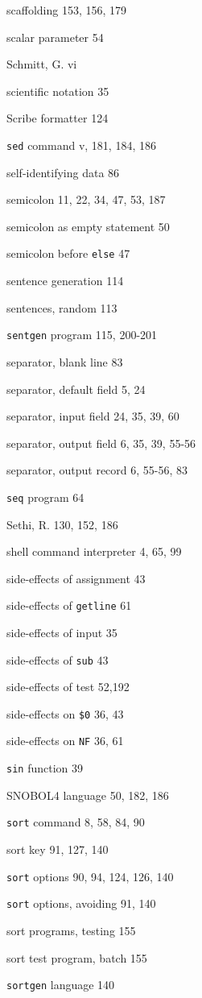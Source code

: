 \begin{multicols}{2}
scaffolding 153, 156, 179

scalar parameter 54

Schmitt, G. vi

scientific notation 35

Scribe formatter 124

\verb'sed' command v, 181, 184, 186

self-identifying data 86

semicolon 11, 22, 34, 47, 53, 187

semicolon as empty statement 50

semicolon before \verb'else' 47

sentence generation 114

sentences, random 113

\verb'sentgen' program 115, 200-201

separator, blank line 83

separator, default field 5, 24

separator, input field 24, 35, 39, 60

separator, output field 6, 35, 39, 55-56

separator, output record 6, 55-56,  83

\verb'seq' program 64

Sethi, R. 130, 152, 186

shell command interpreter 4, 65, 99

side-effects of assignment 43

side-effects of \verb'getline' 61

side-effects of input 35

side-effects of \verb'sub' 43

side-effects of test 52,192

side-effects on \verb'$0' 36, 43

side-effects on \verb'NF' 36, 61

\verb'sin' function 39

SNOBOL4 language 50, 182, 186

\verb'sort' command 8, 58, 84, 90

sort key 91, 127, 140

\verb'sort' options 90, 94, 124, 126, 140

\verb'sort' options, avoiding 91, 140


sort programs, testing 155

sort test program, batch 155

\verb'sortgen' language 140


\end{multicols}
